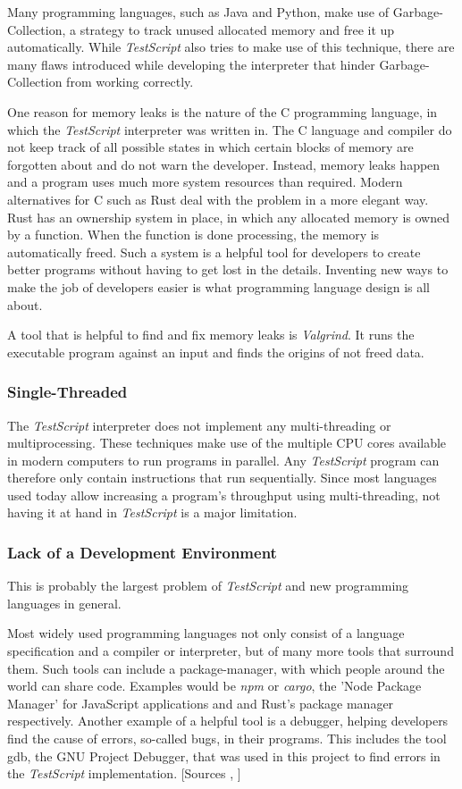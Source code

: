 \documentclass[12pt,a4paper]{article}
\newcommand{\name}{\emph{TestScript}}
\begin{document}
Many programming languages, such as Java and Python,
make use of Garbage-Collection, a strategy to track unused allocated memory and
free it up automatically. While \name{} also tries to make use of this technique,
there are many flaws introduced while developing the interpreter that hinder 
Garbage-Collection from working correctly.

One reason for memory leaks is the nature of the
C programming language, in which the \name{} interpreter was written in. The C language and
compiler do not keep track of all possible states in which certain blocks of memory are
forgotten about and do not warn the developer. Instead, memory leaks happen and a program
uses much more system resources than required.
Modern alternatives for C such as Rust deal with the problem in a more elegant way. 
Rust has an ownership system in place,
in which any allocated memory is owned by a function. When the function
is done processing, the memory is automatically freed. Such a system
is a helpful tool for developers to create better programs without having to get
lost in the details.
Inventing new ways to make the job of developers easier is what programming
language design is all about.

A tool that is helpful to find and fix memory leaks is \emph{Valgrind}. It runs
the executable program against an input and finds the origins of not freed data.

\subsubsection{Single-Threaded}
The \name{} interpreter does not implement any multi-threading or multiprocessing.
These techniques make use of the multiple CPU cores available in modern computers
to run programs in parallel.
Any \name{} program can therefore
only contain instructions that run sequentially.
Since most languages used today allow increasing a
program's throughput using multi-threading, not having it at hand in \name{}
is a major limitation.

\subsubsection{Lack of a Development Environment}
This is probably the largest problem of \name{} and new programming
languages in general.

Most widely used programming languages not only consist
of a language specification and a compiler or interpreter, but of many more
tools that surround them.
Such tools can include a package-manager, with which people around the world
can share code. Examples would be \emph{npm} or \emph{cargo}, 
the 'Node Package Manager' for JavaScript applications and and Rust's package 
manager respectively.
Another example of a helpful tool is a debugger, helping developers
find the cause of errors, so-called bugs, in their programs.
This includes the tool gdb, the GNU Project Debugger, that was used in this
project to find errors in the \name{} implementation.
[Sources , ]
\end{document}
